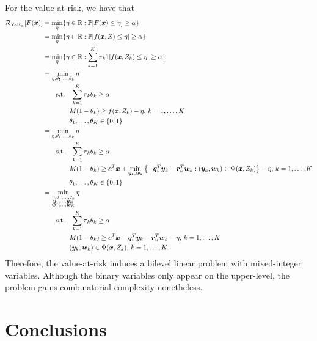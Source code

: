 \documentclass[12pt]{article}
\begin{document}
For the value-at-risk, we have that~\citep[Proposition 17.2.26]{burtscheidtRiskAverseModelsBilevel2020}
\begin{align*}
    \mathcal{R}_{\text{VaR}_{\alpha}}[F(\bm{x})] &= \min_{\eta} \{ \eta \in \mathbb{R} : \mathbb{P}[F(\bm{x})\le \eta] \ge \alpha \} \\
    &= \min_{\eta} \{ \eta \in \mathbb{R} : \mathbb{P}[f(\bm{x},Z)\le \eta] \ge \alpha \} \\
    &= \min_{\eta} \{ \eta \in \mathbb{R} : \sum_{k=1}^{K} \pi_k 1[f(\bm{x},Z_k) \le \eta] \ge \alpha \} \\
    &= \min_{\eta,\theta_1,\ldots,\theta_k} \eta  \\
    &\quad\quad \text{s.t.} \quad \sum_{k=1}^{K} \pi_k \theta_k \ge \alpha \\
    &\quad\quad \quad \quad M (1 - \theta_k) \ge f(\bm{x},Z_k) - \eta,\, k=1,\ldots,K \\
    &\quad\quad \quad \quad \theta_1,\ldots,\theta_K \in \left\{ 0,1 \right\}  \\
    &= \min_{\eta,\theta_1,\ldots,\theta_k} \eta  \\
    &\quad\quad \text{s.t.} \quad \sum_{k=1}^{K} \pi_k \theta_k \ge \alpha \\
    &\quad\quad \quad \quad M (1 - \theta_k) \ge \bm{c}^{T}\bm{x} + \min_{\bm{y}_k,\bm{w}_k}\left\{ -\bm{q}^{T}_u \bm{y}_{k} -\bm{r}^{T}_u \bm{w}_{k} : (\bm{y}_{k},\bm{w}_{k})\in \Psi(\bm{x},Z_k) \right\} - \eta,\, k=1,\ldots,K \\
    &\quad\quad \quad \quad \theta_1,\ldots,\theta_K \in \left\{ 0,1 \right\}  \\
    &= \min_{\substack{\eta,\theta_1,\ldots,\theta_k \\ \bm{y}_1,\ldots,\bm{y}_K \\ \bm{w}_1,\ldots,\bm{w}_K}} \eta  \\
    &\quad\quad \text{s.t.} \quad \sum_{k=1}^{K} \pi_k \theta_k \ge \alpha \\
    &\quad\quad \quad \quad M (1 - \theta_k) \ge \bm{c}^{T}\bm{x} -\bm{q}^{T}_u \bm{y}_{k} -\bm{r}^{T}_u \bm{w}_{k} - \eta,\, k=1,\ldots,K \\
    &\quad\quad \quad \quad (\bm{y}_{k},\bm{w}_{k})\in \Psi(\bm{x},Z_k) ,\, k=1,\ldots,K
.\end{align*}
Therefore, the value-at-risk induces a bilevel linear problem with mixed-integer variables.
Although the binary variables only appear on the upper-level, the problem gains combinatorial complexity nonetheless.


\section*{Conclusions}
\end{document}
